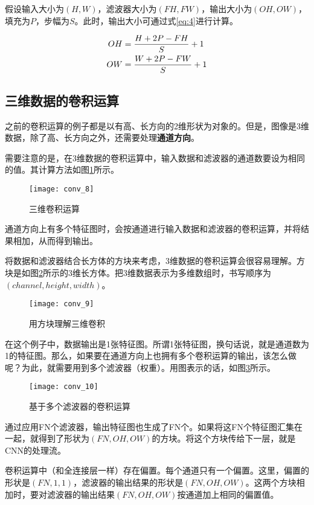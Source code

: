         假设输入大小为$(H, W)$，滤波器大小为$(FH, FW)$，输出大小为$(OH, OW)$，填充为$P$，步幅为$S$。此时，输出大小可通过式\ref{eq:4}进行计算。
        
        \begin{equation}
            \begin{aligned}
                OH &={ {H + 2P - FH} \over {S}} + 1 \\
                OW &={ {W + 2P - FW} \over {S}} + 1
            \end{aligned}
            \label{eq:4}
        \end{equation}

    \subsection{三维数据的卷积运算}   
        
        之前的卷积运算的例子都是以有高、长方向的2维形状为对象的。但是，图像是3维数据，除了高、长方向之外，还需要处理\textbf{通道方向}。
        
        需要注意的是，在3维数据的卷积运算中，输入数据和滤波器的通道数要设为相同的值。其计算方法如图\ref{fig:8}所示。 
        
        \begin{figure}[!htbp]
            \centering
            \texttt{[image: conv\_8]}
            \caption{三维卷积运算}
            \label{fig:8}
        \end{figure}
    
        通道方向上有多个特征图时，会按通道进行输入数据和滤波器的卷积运算，并将结果相加，从而得到输出。
        
        将数据和滤波器结合长方体的方块来考虑，3维数据的卷积运算会很容易理解。方块是如图\ref{fig:9}所示的3维长方体。把3维数据表示为多维数组时，书写顺序为$(channel, height, width)$。
        
        \begin{figure}[!htbp]
            \centering
            \texttt{[image: conv\_9]}
            \caption{用方块理解三维卷积}
            \label{fig:9}
        \end{figure}
    
        在这个例子中，数据输出是1张特征图。所谓1张特征图，换句话说，就是通道数为1的特征图。那么，如果要在通道方向上也拥有多个卷积运算的输出，该怎么做呢？为此，就需要用到多个滤波器（权重）。用图表示的话，如图\ref{fig:10}所示。
        
        \begin{figure}[!htbp]
            \centering
            \texttt{[image: conv\_10]}
            \caption{基于多个滤波器的卷积运算}
            \label{fig:10}
        \end{figure}
        
        通过应用FN个滤波器，输出特征图也生成了FN个。如果将这FN个特征图汇集在一起，就得到了形状为$(FN, OH, OW)$的方块。将这个方块传给下一层，就是CNN的处理流。
        
        卷积运算中（和全连接层一样）存在偏置。每个通道只有一个偏置。这里，偏置的形状是$(FN, 1, 1)$，滤波器的输出结果的形状是$(FN, OH, OW)$。这两个方块相加时，要对滤波器的输出结果$(FN, OH, OW)$按通道加上相同的偏置值。
        
            